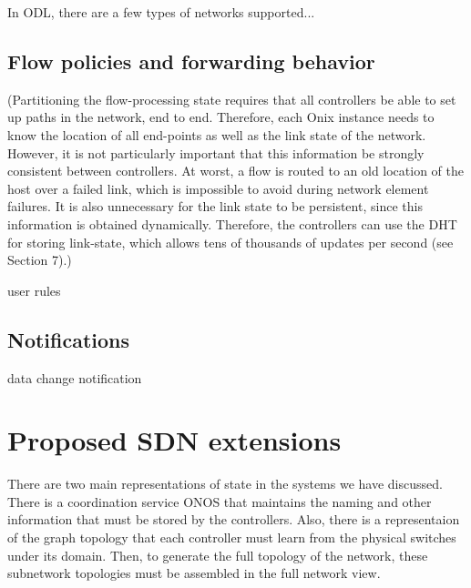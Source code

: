 \documentclass[letterpaper,twocolumn,10pt]{article}
\begin{document}
In ODL, there are a few types of networks supported...

\subsection*{Flow policies and forwarding behavior}

(Partitioning the flow-processing state requires that all controllers be able to set up paths in the network, end to end. Therefore, each Onix instance needs to know the location of all end-points as well as the link state of the network. However, it is not particularly important that this information be strongly consistent between controllers. At worst, a flow is routed to an old location of the host over a failed link, which is impossible to avoid during network element failures.
It is also unnecessary for the link state to be persistent, since this information is obtained dynamically. Therefore, the controllers can use the DHT for storing link-state, which allows tens of thousands of updates per second (see Section 7).)

user rules

\subsection*{Notifications}
data change notification
  

\section{Proposed SDN extensions}

There are two main representations of state in the systems we have discussed. There is a coordination service ONOS that maintains the naming and other information that must be stored by the controllers. Also, there is a representaion of the graph topology that each controller must learn from the physical switches under its domain. Then, to generate the full topology of the network, these subnetwork topologies must be assembled in the full network view.
\end{document}
